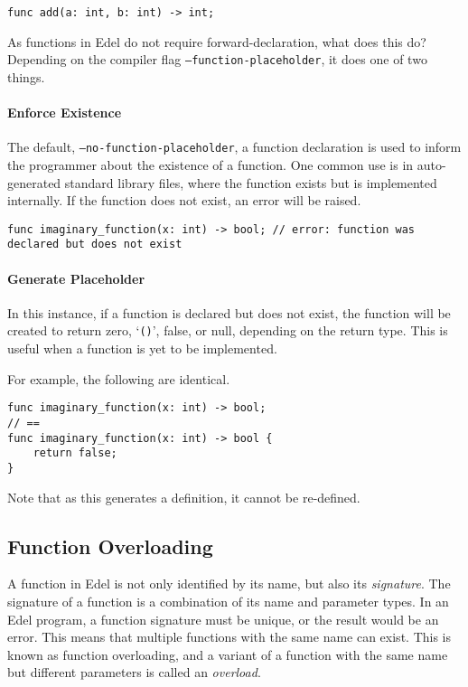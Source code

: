 \documentclass{article}
\begin{document}
    \begin{lstlisting}[language=CustomLang]
func add(a: int, b: int) -> int;
    \end{lstlisting}

    As functions in Edel do not require forward-declaration, what does this do?
    Depending on the compiler flag \texttt{--function-placeholder}, it does one of two things.

    \paragraph*{Enforce Existence}

    The default, \texttt{--no-function-placeholder}, a function declaration is used to inform the programmer about the existence of a function.
    One common use is in auto-generated standard library files, where the function exists but is implemented internally.
    If the function does not exist, an error will be raised.

    \begin{lstlisting}[language=CustomLang]
func imaginary_function(x: int) -> bool; // error: function was declared but does not exist
    \end{lstlisting}

    \paragraph*{Generate Placeholder}

    In this instance, if a function is declared but does not exist, the function will be created to return zero, `\texttt{()}', false, or null, depending on the return type.
    This is useful when a function is yet to be implemented.

    For example, the following are identical.
    \begin{lstlisting}[language=CustomLang]
func imaginary_function(x: int) -> bool;
// ==
func imaginary_function(x: int) -> bool {
    return false;
}
    \end{lstlisting}


    Note that as this generates a definition, it cannot be re-defined.

    \subsection{Function Overloading}\label{subsec:function-overloading}

    A function in Edel is not only identified by its name, but also its \textit{signature}.
    The signature of a function is a combination of its name and parameter types.
    In an Edel program, a function signature must be unique, or the result would be an error.
    This means that multiple functions with the same name can exist.
    This is known as function overloading, and a variant of a function with the same name but different parameters is called an \textit{overload}.
\end{document}
